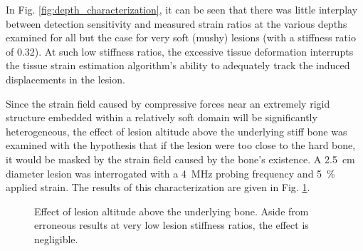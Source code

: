 			In Fig. \ref{fig:depth_characterization}, it can be seen that there was little interplay between detection sensitivity and measured strain ratios at the various depths examined for all but the case for very soft (mushy) lesions (with a stiffness ratio of 0.32). At such low stiffness ratios, the excessive tissue deformation interrupts the tissue strain estimation algorithm's ability to adequately track the induced displacements in the lesion.

			Since the strain field caused by compressive forces near an extremely rigid structure embedded within a relatively soft domain will be significantly heterogeneous, the effect of lesion altitude above the underlying stiff bone was examined with the hypothesis that if the lesion were too close to the hard bone, it would be masked by the strain field caused by the bone's existence. A \SI{2.5}{\cm} diameter lesion was interrogated with a \SI{4}{\MHz} probing frequency and \SI{5}{\percent} applied strain. The results of this characterization are given in Fig. \ref{fig:bottomsep_characterization}.

			\begin{figure}[!htb]
				\centering
				\caption[Quasi-static lesion altitude characterization]{Effect of lesion altitude above the underlying bone. Aside from erroneous results at very low lesion stiffness ratios, the effect is negligible.}
				\label{fig:bottomsep_characterization}
			\end{figure}

